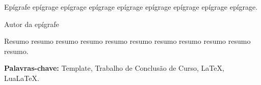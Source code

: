 \begin{epigrafe}
    Epígrafe epígrage epígrage epígrage epígrage epígrage epígrage
    epígrage epígrage.
    
    \bigskip
    
    Autor da epígrafe
\end{epigrafe}


\begin{resumo}
    \noindent\descricaoresumo\hfill\break\smallskip

    Resumo resumo resumo resumo resumo resumo resumo resumo resumo resumo resumo.

    \noindent\textbf{Palavras-chave:}
    Template, Trabalho de Conclusão de Curso, \LaTeX, Lua\LaTeX.
\end{resumo}

\begin{abstract}
    \noindent\descricaoabstract\hfill\break\smallskip

    Abstract abstract abstract abstract abstract abstract abstract abstract abstract.

    \noindent\textbf{Keywords:}
    Template, Undergraduate Thesis, \LaTeX, Lua\LaTeX.
\end{abstract}